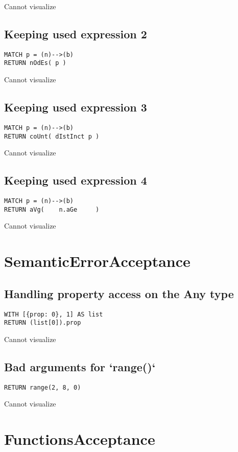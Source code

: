 Cannot visualize
\subsection{Keeping used expression 2}

\begin{lstlisting}
MATCH p = (n)-->(b)
RETURN nOdEs( p )
\end{lstlisting}

Cannot visualize
\subsection{Keeping used expression 3}

\begin{lstlisting}
MATCH p = (n)-->(b)
RETURN coUnt( dIstInct p )
\end{lstlisting}

Cannot visualize
\subsection{Keeping used expression 4}

\begin{lstlisting}
MATCH p = (n)-->(b)
RETURN aVg(    n.aGe     )
\end{lstlisting}

Cannot visualize
\section{SemanticErrorAcceptance}

\subsection{Handling property access on the Any type}

\begin{lstlisting}
WITH [{prop: 0}, 1] AS list
RETURN (list[0]).prop
\end{lstlisting}

Cannot visualize
\subsection{Bad arguments for `range()`}

\begin{lstlisting}
RETURN range(2, 8, 0)
\end{lstlisting}

Cannot visualize
\section{FunctionsAcceptance}

